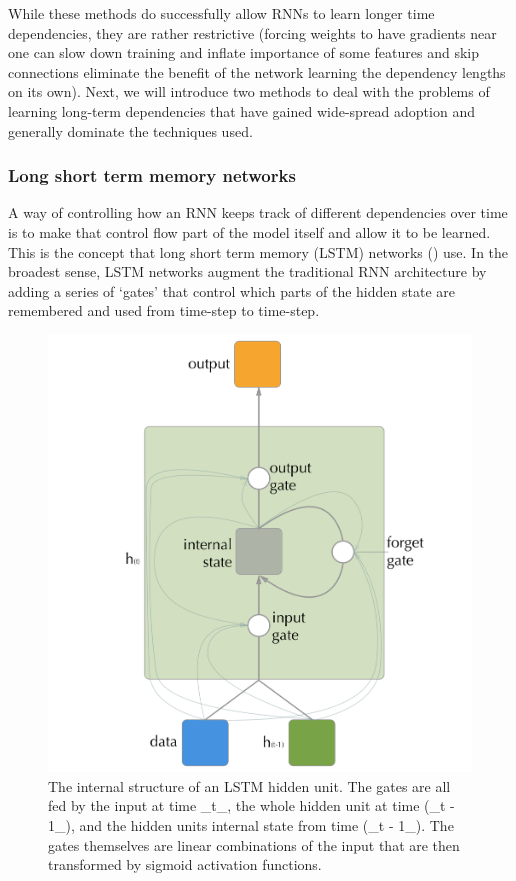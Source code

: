 \documentclass[]{book}
\theoremstyle{definition}
\theoremstyle{definition}
\theoremstyle{definition}
\theoremstyle{remark}
\begin{document}
While these methods do successfully allow RNNs to learn longer time
dependencies, they are rather restrictive (forcing weights to have
gradients near one can slow down training and inflate importance of some
features and skip connections eliminate the benefit of the network
learning the dependency lengths on its own). Next, we will introduce two
methods to deal with the problems of learning long-term dependencies
that have gained wide-spread adoption and generally dominate the
techniques used.

\subsubsection{Long short term memory
networks}\label{long-short-term-memory-networks}

A way of controlling how an RNN keeps track of different dependencies
over time is to make that control flow part of the model itself and
allow it to be learned. This is the concept that long short term memory
(LSTM) networks (\citet{lstm_intro}) use. In the broadest sense, LSTM
networks augment the traditional RNN architecture by adding a series of
`gates' that control which parts of the hidden state are remembered and
used from time-step to time-step.

\begin{figure}

{\centering \includegraphics[width=0.6\linewidth]{figures/lstm_cell} 

}

\caption{The internal structure of an LSTM hidden unit. The gates are all fed by the input at time _t_, the whole hidden unit at time (_t - 1_), and the hidden units internal state from time (_t - 1_). The gates themselves are linear combinations of the input that are then transformed by sigmoid activation functions.}\label{fig:lstmdiagram}
\end{figure}
\end{document}
